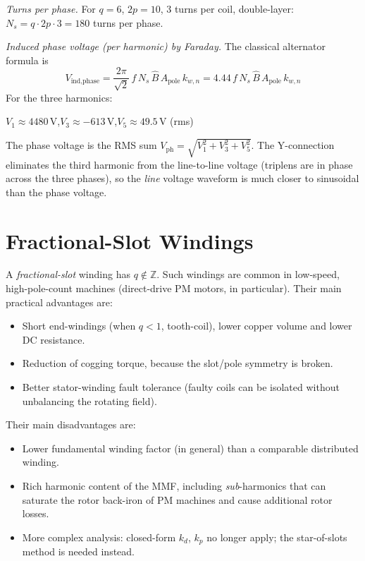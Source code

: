 \documentclass[12pt,a4paper]{article}
\newcommand{\unit}[1]{\ensuremath{\,\mathrm{#1}}}
\begin{document}
\emph{Turns per phase.}
For $q=6$, $2p=10$, 3 turns per coil, double-layer:
$N_s = q\cdot 2p\cdot 3 = 180$ turns per phase.

\emph{Induced phase voltage (per harmonic) by Faraday.}
The classical alternator formula is
\begin{equation}
  V_\text{ind,phase}
    = \frac{2\pi}{\sqrt{2}}\,f\,N_s\,\hat{B}\,A_\text{pole}\,k_{w,n}
    = 4.44\,f\,N_s\,\hat{B}\,A_\text{pole}\,k_{w,n}
\end{equation}
For the three harmonics:
\begin{center}
  $V_1 \approx 4480\unit{V}$,\quad $V_3 \approx -613\unit{V}$,\quad $V_5 \approx 49.5\unit{V}$ (rms)
\end{center}
The phase voltage is the RMS sum
$V_\text{ph} = \sqrt{V_1^2 + V_3^2 + V_5^2}$.
The Y-connection eliminates the third harmonic from the line-to-line
voltage (triplens are in phase across the three phases), so the
\emph{line} voltage waveform is much closer to sinusoidal than the
phase voltage.

\section{Fractional-Slot Windings}
\label{sec:fractional}

A \emph{fractional-slot} winding has $q \notin \mathbb{Z}$.
Such windings are common in low-speed, high-pole-count machines
(direct-drive PM motors, in particular). Their main practical
advantages are:
\begin{itemize}[noitemsep]
  \item Short end-windings (when $q<1$, tooth-coil), lower copper
        volume and lower DC resistance.
  \item Reduction of cogging torque, because the slot/pole
        symmetry is broken.
  \item Better stator-winding fault tolerance (faulty coils can be
        isolated without unbalancing the rotating field).
\end{itemize}
Their main disadvantages are:
\begin{itemize}[noitemsep]
  \item Lower fundamental winding factor (in general) than a
        comparable distributed winding.
  \item Rich harmonic content of the MMF, including \emph{sub}-harmonics
        that can saturate the rotor back-iron of PM machines and
        cause additional rotor losses.
  \item More complex analysis: closed-form $k_d$, $k_p$ no longer
        apply; the star-of-slots method is needed instead.
\end{itemize}
\end{document}
